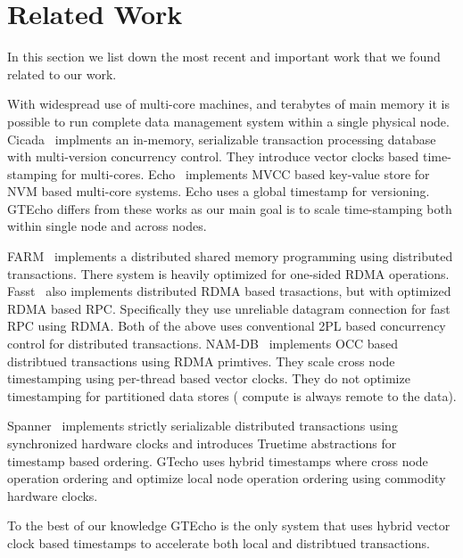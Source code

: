 

\section{Related Work}
In this section we list down the most recent and important work that we 
found related to our work. 

With widespread use of multi-core machines, and terabytes of main memory
it is possible to run complete data management system within a single 
physical node. Cicada~\cite{cicada} implments an in-memory, serializable
transaction processing database with multi-version concurrency control. They
introduce vector clocks based time-stamping for multi-cores. Echo~\cite{echo}
implements MVCC based key-value store for NVM based multi-core systems. Echo 
uses a global timestamp for versioning. GTEcho differs from these works as
our main goal is to scale time-stamping both within single node and across nodes.

FARM~\cite{farm} implements a distributed shared memory programming using distributed 
transactions. There system is heavily optimized for one-sided RDMA operations.
Fasst~\cite{fasst} also implements distributed RDMA based trasactions, but with 
optimized RDMA based RPC. Specifically they use unreliable datagram connection
for fast RPC using RDMA. Both of the above uses conventional 2PL based concurrency
control for distributed transactions. NAM-DB~\cite{namdb} implements OCC based 
distribtued transactions using RDMA primtives. They scale cross node timestamping
using per-thread based vector clocks. They do not optimize timestamping for 
partitioned data stores ( compute is always remote to the data).

Spanner~\cite{spanner} implements strictly serializable distributed transactions
using synchronized hardware clocks and introduces Truetime abstractions for 
timestamp based ordering. GTecho uses hybrid timestamps where cross node operation
ordering and optimize local node operation ordering using commodity hardware clocks.

To the best of our knowledge GTEcho is the only system that uses hybrid vector
clock based timestamps to accelerate both local and distribtued transactions.

